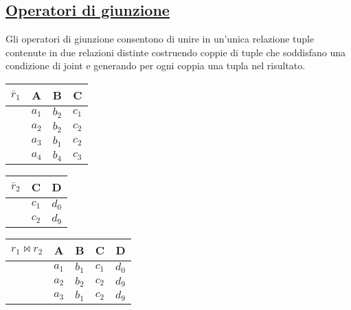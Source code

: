 \documentclass[a4paper, 10pt]{report}
\begin{document}
\subsection*{\underline{Operatori di giunzione}}
Gli operatori di giunzione consentono di unire in un'unica relazione tuple contenute in due relazioni distinte costruendo coppie di tuple che soddisfano una condizione di joint e generando per ogni coppia una tupla nel risultato.

\begin{multicols}{3}
				\begin{tabular}{cccc}
					$\bar{r}_1$ & A   	& B & C    \\
					\midrule
							    & $a_1$ & $b_2$ & $c_1$ \\
							    & $a_2$ & $b_2$ & $c_2$\\
							    & $a_3$ & $b_1$ & $c_2$\\
							    & $a_4$ & $b_4$ & $c_3$
	 			\end{tabular}
	 			
	 			\columnbreak
	 			
	 			\begin{tabular}{ccc}
	 				$\bar{r}_2$ & C	& D		\\
	 				\midrule	
				 				& $c_1$ & $d_0$ \\
				 				& $c_2$ & $d_9$ 
	 			\end{tabular}
	 			
	 			\columnbreak
	 			
			\begin{tabular}{ccccc}
				$r_1 \Join r_2$ & A		& B		  & C & D		\\
				\midrule
			    & $ a_1 $ & $ b_1 $ & $ c_1 $ & $d_0$\\
			    & $ a_2 $ & $ b_2 $ & $ c_2 $ & $d_9$\\
			    & $ a_3 $ & $ b_1 $ & $ c_2 $ & $d_9$
			\end{tabular}
\end{multicols}
\end{document}
